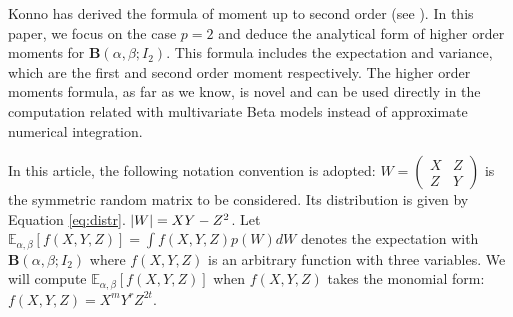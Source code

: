 \documentclass[twoside]{article}%
\DeclarePairedDelimiter\abs{\lvert}{\rvert}
\def\E{\mathbb{E}}
\begin{document}
Konno has derived the formula of moment up to second order (see \cite{konno_1988}).
In this paper, we focus on the case $p=2$ and deduce the analytical form of 
higher order moments for $\mathbf{B}(\alpha, \beta; I_2)$.
This formula
includes the expectation and variance, which are the first and second
order moment respectively. The higher order moments formula, as
far as we know, is novel and can be used directly in the computation
related with multivariate Beta models instead of approximate
numerical integration.

In this article, the following notation convention is adopted:
$W=\begin{pmatrix} X & Z \\ Z & Y \end{pmatrix}$ is the symmetric random
matrix to be considered. Its distribution is given by Equation \eqref{eq:distr}.
$\abs{W}=XY-Z^2$.
Let $\E_{\alpha,\beta}[f(X,Y, Z)] = \int f(X,Y,Z)p(W)dW$ denotes the expectation
with $\mathbf{B}(\alpha, \beta;I_2)$ where $f(X, Y, Z)$ is an arbitrary function with three
variables. We will compute $\E_{\alpha,\beta}[f(X,Y, Z)]$
when $f(X,Y,Z)$ takes the monomial form: $f(X,Y,Z)=X^m Y^r Z^{2t}$.
\end{document}
